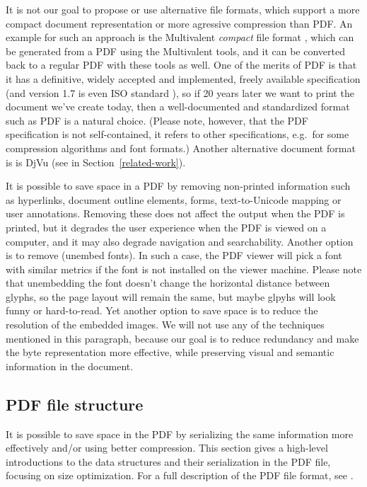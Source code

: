 \documentclass{ltugproc}
\begin{document}
It is not our goal to propose or use
alternative file formats, which support a more
compact document representation or more agressive compression than PDF. An
example for such an approach is the Multivalent \emph{compact} file format
\cite{multivalent-compact}, which can be generated from a PDF using the
Multivalent tools, and it can be converted back to a regular PDF with these
tools as well. One of the merits of PDF is that it has a definitive, widely
accepted and implemented, freely available
specification \cite{pdfref} (and version 1.7 is
even ISO standard \cite{pdf-iso}), so if 20 years later we want to
print the document we've create today, then a well-documented and
standardized format such as PDF is a natural choice. (Please note, however,
that the PDF specification is not self-contained, it refers to other
specifications, e.g.\ for some compression algorithms and font formats.)
Another alternative document format is is DjVu (see in
Section~\ref{related-work}).

It is possible to save space in a PDF by removing non-printed information
such as hyperlinks, document outline elements, forms, text-to-Unicode
mapping or user annotations. Removing these does not affect the output when
the PDF is printed, but it degrades the user experience when the PDF is
viewed on a computer, and it may also degrade navigation and searchability.
Another option is to remove (unembed fonts). In such a case, the PDF viewer
will pick a font with similar metrics if the font is not installed on the
viewer machine. Please note that unembedding the font doesn't change the
horizontal distance between glyphs, so the page layout will remain the
same, but maybe glpyhs will look funny or hard-to-read. Yet another option
to save space is to reduce the resolution of the embedded images. We will
not use any of the techniques mentioned in this paragraph, because our goal
is to reduce redundancy and make the byte representation more effective,
while preserving visual and semantic information in the document.

\subsection{PDF file structure}

It is possible to save space in the PDF by serializing the same information
more effectively and/or using better compression. This section gives a
high-level introductions to the data structures and their serialization in
the PDF file, focusing on size optimization. For a full description of the
PDF file format, see \cite{pdfref}.
\end{document}
